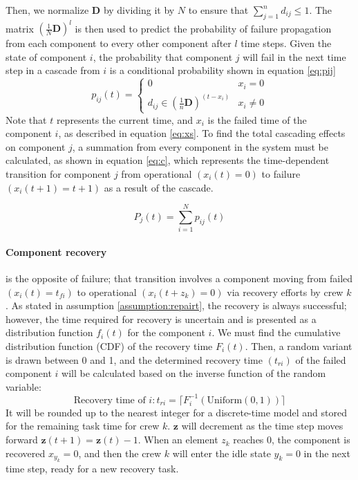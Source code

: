 \documentclass[conference]{IEEEtran}
\begin{document}
Then, we normalize $\mathbf{D}$ by dividing it by $N$ to ensure that $\sum^{n}_{j=1}d_{ij} \leq 1$. The matrix $\left( \frac{1}{N} \mathbf{D} \right)^l$ is then used to predict the probability of failure propagation from each component to every other component after $l$ time steps. Given the state of component $i$, the probability that component $j$ will fail in the next time step in a cascade from $i$ is a conditional probability shown in equation \ref{eq:pij}
\begin{equation}
p_{ij}(t) = \begin{cases}
    0 & x_i = 0 \\
    d_{ij} \in \left( \frac{1}{n} \mathbf{D} \right)^{(t-x_i)}    &x_i \neq 0
\end{cases}
\label{eq:pij}
\end{equation}
Note that $t$ represents the current time, and $x_i$ is the failed time of the component $i$, as described in equation \ref{eq:xs}. 
To find the total cascading effects on component $j$, a summation from every component in the system must be calculated, as shown in equation \ref{eq:c}, which represents the time-dependent transition for component $j$ from operational $(x_i(t) = 0)$ to failure $(x_i(t+1) = t+1)$ as a result of the cascade.

\begin{equation}
P_j(t)= \sum_{i=1}^{N} p_{ij}(t)
    \label{eq:c}
\end{equation}

\paragraph{Component recovery}
is the opposite of failure; that transition involves a component moving from failed $(x_i(t) =t_{fi})$ to operational $(x_i(t+z_k) = 0)$ via recovery efforts by crew $k$. As stated in assumption \ref{assumption:repairt}, the recovery is always successful; however, the time required for recovery is uncertain and is presented as a distribution function $f_i(t)$ for the component $i$. We must find the cumulative distribution function (CDF) of the recovery time $F_i(t)$. Then, a random variant is drawn between 0 and 1, 
and the determined recovery time $(t_{ri})$ of the failed component $i$ will be calculated based on the inverse function of the random variable:
\begin{equation}
    \text{Recovery time of }i :t_{ri} = \lceil F_i^{-1}(\text{Uniform}(0,1)) \rceil
    \label{eq:tri}
\end{equation}
It will be rounded up to the nearest integer for a discrete-time model and stored for the remaining task time for crew $k$. $\mathbf{z}$ will decrement as the time step moves forward $\mathbf{z}(t+1) = \mathbf{z}(t) - 1$. When an element $z_k$ reaches 0, the component is recovered $x_{y_k} = 0$, and then the crew $k$ will enter the idle state $y_k = 0$ in the next time step, ready for a new recovery task.
\end{document}
